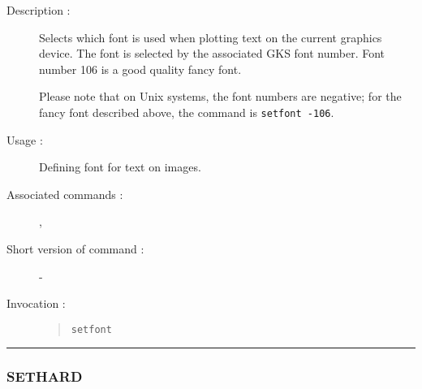 \begin{description}

\item[Description :] Selects which font is used when plotting text on
the current graphics device.  The font is selected by the associated
GKS font number.  Font number 106 is a good quality fancy font.

Please note that on Unix systems, the font numbers are negative; for the
fancy font described above, the command is {\tt setfont -106}.

\item[Usage :] Defining font for text on images.

\item[Associated commands :] {\tt {}},
{\tt {}}

\item[Short version of command :] -
\item[Invocation :]

\begin{quote}{\tt  setfont }\end{quote}

\end{description}

\hrule
\subsubsection*{\label{SETHARD}SETHARD}

